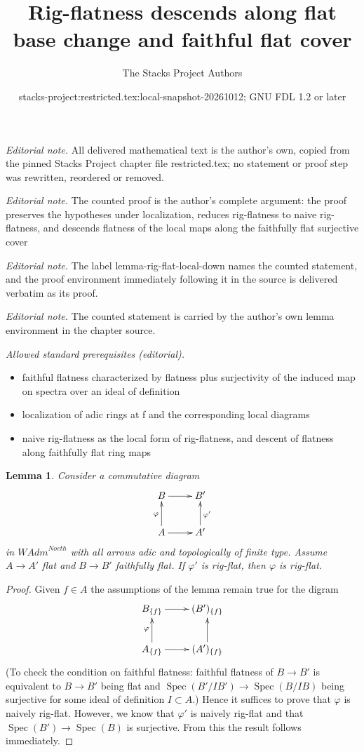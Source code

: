 \documentclass[10pt,a4paper]{amsart}
\title{Rig-flatness descends along flat base change and faithful flat cover}
\author{The Stacks Project Authors}
\date{stacks-project:restricted.tex:local-snapshot-20261012; GNU FDL 1.2 or later}
\theoremstyle{plain}
\newtheorem{lemma}[subsection]{Lemma}
\theoremstyle{definition}
\theoremstyle{remark}
\numberwithin{equation}{subsection}
\def\Spec{\mathop{\mathrm{Spec}}}
\begin{document}
\maketitle
\noindent\textit{Editorial note.} All delivered mathematical text is the author's own, copied from the pinned Stacks Project chapter file restricted.tex; no statement or proof step was rewritten, reordered or removed.\par\medskip
\noindent\textit{Editorial note.} The counted proof is the author's complete argument: the proof preserves the hypotheses under localization, reduces rig-flatness to naive rig-flatness, and descends flatness of the local maps along the faithfully flat surjective cover\par\medskip
\noindent\textit{Editorial note.} The label lemma-rig-flat-local-down names the counted statement, and the proof environment immediately following it in the source is delivered verbatim as its proof.\par\medskip
\noindent\textit{Editorial note.} The counted statement is carried by the author's own lemma environment in the chapter source.\par\medskip
\noindent\textit{Allowed standard prerequisites (editorial).}\begin{itemize}
\item faithful flatness characterized by flatness plus surjectivity of the induced map on spectra over an ideal of definition
\item localization of adic rings at f and the corresponding local diagrams
\item naive rig-flatness as the local form of rig-flatness, and descent of flatness along faithfully flat ring maps
\end{itemize}\medskip
\begin{lemma}
\label{lemma-rig-flat-local-down}
Consider a commutative diagram
$$
\xymatrix{
B \ar[r] & B' \\
A \ar[r] \ar[u]^\varphi & A' \ar[u]_{\varphi'}
}
$$
in $\textit{WAdm}^{Noeth}$ with all arrows adic and topologically
of finite type. Assume $A \to A'$ flat and $B \to B'$ faithfully flat.
If $\varphi'$ is rig-flat, then $\varphi$ is rig-flat.
\end{lemma}

\begin{proof}
Given $f \in A$ the assumptions of the lemma remain true for the digram
$$
\xymatrix{
B_{\{f\}} \ar[r] & (B')_{\{f\}} \\
A_{\{f\}} \ar[r] \ar[u]^\varphi & (A')_{\{f\}} \ar[u]
}
$$
(To check the condition on faithful flatness: faithful flatness
of $B \to B'$ is equivalent to $B \to B'$ being flat and
$\Spec(B'/IB') \to \Spec(B/IB)$ being
surjective for some ideal of definition $I \subset A$.)
Hence it suffices to prove that $\varphi$ is naively rig-flat.
However, we know that $\varphi'$ is naively rig-flat and
that $\Spec(B') \to \Spec(B)$ is surjective. From this the
result follows immediately.
\end{proof}
\end{document}
